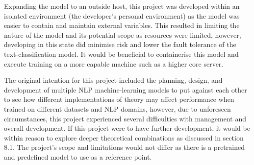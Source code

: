 Expanding the model to an outside host, this project was developed within an isolated environment (the developer’s personal environment) as the model was easier to contain and maintain external variables. This resulted in limiting the nature of the model and its potential scope as resources were limited, however, developing in this state did minimise risk and lower the fault tolerance of the text-classification model. It would be beneficial to containerise this model and execute training on a more capable machine such as a higher core server.

The original intention for this project included the planning, design, and development of multiple NLP machine-learning models to put against each other to see how different implementations of theory may affect performance when trained on different datasets and NLP domains, however, due to unforeseen circumstances, this project experienced several difficulties with management and overall development. If this project were to have further development, it would be within reason to explore deeper theoretical combinations as discussed in section 8.1. The project’s scope and limitations would not differ as there is a pretrained and predefined model to use as a reference point.
